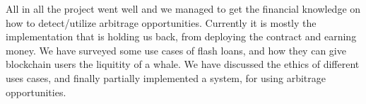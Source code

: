 All in all the project went well and we managed to get the financial knowledge
on how to detect/utilize arbitrage opportunities. Currently it is mostly the
implementation that is holding us back, from deploying the contract and earning
money. We have surveyed some use cases of flash loans, and how they can give
blockchain users the liquitity of a whale. We have discussed the ethics of
different uses cases, and finally partially implemented a system, for using
arbitrage opportunities.
